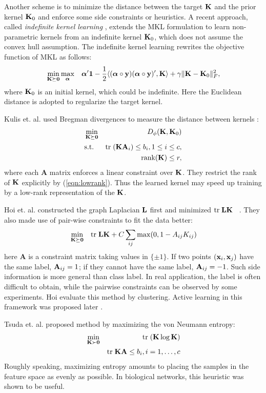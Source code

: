 Another scheme is to minimize the distance between the target ${\mathbf K}$ and the prior kernel ${\mathbf K}_0$ and enforce some side constraints or heuristics. A recent approach, called {\em indefinite kernel learning}
\cite{nips/LussD07,icml/ChenY08,nips/YingCG09}, extends the MKL formulation to learn non-parametric kernels from an indefinite kernel ${\mathbf K}_0$, which does not assume the convex hull assumption.  The indefinite kernel learning rewrites the objective function of MKL as follows:
\begin{eqnarray}
&\min_{\K\psd}\max_\ba& \ba'\1 - \frac{1}{2}\langle (\ba\circ\y)(\ba\circ\y)', \K\rangle + \gamma\|\K-\K_0\|^2_F, \label{eqn:indefinite}
\end{eqnarray}
where ${\mathbf K}_0$ is an initial kernel, which could be indefinite. Here the Euclidean  distance is adopted to regularize the target kernel.

Kulis et. al. used Bregman divergences to measure the distance between kernels \cite{icml/KulisSD06}:
\begin{eqnarray}
&\min_{\K\psd}& D_{\phi}(\K,\K_0) \label{eqn:bregman}\\
&\mbox{s.t.}& \tr(\K\mathbf A_i)\leq b_i,1\leq i \leq c,\\
&&  \mbox{rank}(\K)\leq r \label{eqn:lowrank},
\end{eqnarray}
where each $\mathbf A$ matrix enforces a linear constraint over ${\mathbf K}$. They restrict the rank of ${\mathbf K}$ explicitly by (\ref{eqn:lowrank}). Thus the learned kernel may speed up training by a low-rank representation of the ${\mathbf K}$.

Hoi et. al. constructed the graph Laplacian ${\bf L}$ first and minimized ${\mbox{tr}\;} {\bf L}{\mathbf K}$ ~\cite{icml/HoiJL07}. They also made use of pair-wise constraints to fit the data better:
\begin{eqnarray}
&\min_{{\mathbf K}{\succeq{\mathbf 0}}}& {\mbox{tr}\;} {\bf L}{\mathbf K}+C\sum_{ij}\max(0,1-A_{ij}K_{ij})
\end{eqnarray}
here $\mathbf A$ is a constraint matrix taking values in $\{\pm1\}$. If two points $(\mathbf{x}_i,\mathbf{x}_j)$ have the same label, ${\bf A}_{ij}=1$; if they cannot have the same label, ${\bf A}_{ij}=-1$. Such side information is more general than class label. In real application, the label is often difficult to obtain, while the pairwise constraints can be observed by some experiments. Hoi evaluate this method by clustering. Active learning in this framework was proposed later \cite{icml/HoiJ08}.

Tsuda et. al. proposed method by maximizing the von Neumann entropy\cite{ismb/TsudaN04}:
\begin{eqnarray}
&\min_{{\mathbf K}\succ{\mathbf 0}}& {\mbox{tr}\;}({\mathbf K}\log{\mathbf K})\\
&&  {\mbox{tr}\;} {\mathbf K}{\bf A}\leq b_i,i=1,\ldots,c
\end{eqnarray}
Roughly speaking, maximizing entropy amounts to placing the samples in the feature space as evenly as possible. In biological networks, this heuristic was shown to be useful.

